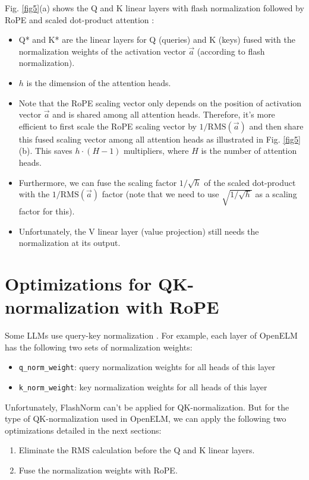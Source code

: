 \documentclass{article}
\numberwithin{equation}{section} %
\def\rms{\text{RMS}(\vec{a})}         %
\def\a{\vec{a}}                       %
\begin{document}
Fig. \ref{fig5}(a) shows the Q and K linear layers with flash normalization followed by RoPE \citep{RoPE} and scaled dot-product attention \citep{vanilla}:
\begin{itemize}[topsep=-1pt, itemsep=-1pt]
  \item Q* and K* are the linear layers for Q (queries) and K (keys) fused with the normalization weights of the activation vector $\a$ (according to flash normalization).
  \item $h$ is the dimension of the attention heads.
  \item Note that the RoPE scaling vector only depends on the position of activation vector $\a$ and is shared among all attention heads. Therefore, it’s more efficient to first scale the RoPE scaling vector by $1/ \rms$ and then share this fused scaling vector among all attention heads as illustrated in Fig. \ref{fig5}(b). This saves $h \cdot (H - 1)$ multipliers, where $H$ is the number of attention heads.
  \item Furthermore, we can fuse the scaling factor $1/ \sqrt{h}$ of the scaled dot-product with the $1/ \rms$ factor (note that we need to use $\sqrt{1/ \sqrt{h}}$ as a scaling factor for this).
  \item Unfortunately, the V linear layer (value projection) still needs the normalization at its output.
\end{itemize}

\section{Optimizations for QK-normalization with RoPE}
Some LLMs use query-key normalization \citep{QKnorm}. For example, each layer of OpenELM \citep{openelm} has the following two sets of normalization weights:
\begin{itemize}[topsep=-1pt, itemsep=-1pt]
  \item \verb+q_norm_weight+: query normalization weights for all heads of this layer
  \item \verb+k_norm_weight+: key normalization weights for all heads of this layer
\end{itemize}
Unfortunately, FlashNorm can't be applied for QK-normalization. But for the type of QK-normalization used in OpenELM, we can apply the following two optimizations detailed in the next sections:
\begin{enumerate}[topsep=-1pt, itemsep=-1pt]
  \item Eliminate the RMS calculation before the Q and K linear layers.
  \item Fuse the normalization weights with RoPE.
\end{enumerate}
\end{document}
